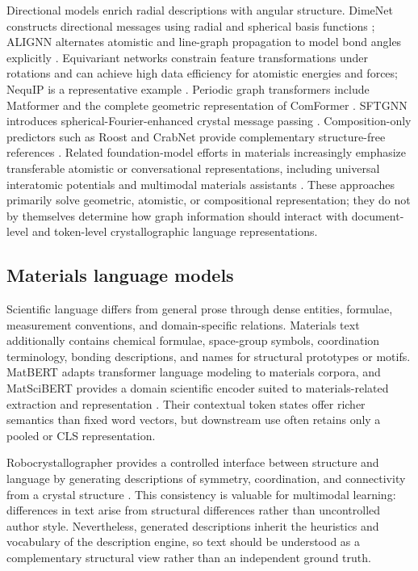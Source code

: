 \documentclass[a4paper,fleqn]{cas-sc}
\begin{document}
Directional models enrich radial descriptions with angular structure. DimeNet constructs directional messages using radial and spherical basis functions \citep{gasteiger2020dimenet}; ALIGNN alternates atomistic and line-graph propagation to model bond angles explicitly \citep{choudhary2021alignn}. Equivariant networks constrain feature transformations under rotations and can achieve high data efficiency for atomistic energies and forces; NequIP is a representative example \citep{batzner2022nequip}. Periodic graph transformers include Matformer and the complete geometric representation of ComFormer \citep{yan2022matformer,yan2024comformer}. SFTGNN introduces spherical-Fourier-enhanced crystal message passing \citep{jiang2025sftgnn}. Composition-only predictors such as Roost and CrabNet provide complementary structure-free references \citep{goodall2020roost,wang2021crabnet}. Related foundation-model efforts in materials increasingly emphasize transferable atomistic or conversational representations, including universal interatomic potentials and multimodal materials assistants \citep{chen2022m3gnet,deng2023chgnet,batatia2023mace,tang2025matterchat}. These approaches primarily solve geometric, atomistic, or compositional representation; they do not by themselves determine how graph information should interact with document-level and token-level crystallographic language representations.

\subsection{Materials language models}
Scientific language differs from general prose through dense entities, formulae, measurement conventions, and domain-specific relations. Materials text additionally contains chemical formulae, space-group symbols, coordination terminology, bonding descriptions, and names for structural prototypes or motifs. MatBERT adapts transformer language modeling to materials corpora, and MatSciBERT provides a domain scientific encoder suited to materials-related extraction and representation \citep{walker2021matbert,gupta2022matscibert}. Their contextual token states offer richer semantics than fixed word vectors, but downstream use often retains only a pooled or CLS representation.

Robocrystallographer provides a controlled interface between structure and language by generating descriptions of symmetry, coordination, and connectivity from a crystal structure \citep{ganose2019robocrystallographer}. This consistency is valuable for multimodal learning: differences in text arise from structural differences rather than uncontrolled author style. Nevertheless, generated descriptions inherit the heuristics and vocabulary of the description engine, so text should be understood as a complementary structural view rather than an independent ground truth.
\end{document}
